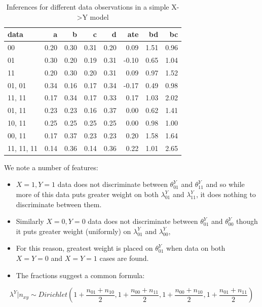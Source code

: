 \documentclass[
  12pt,
]{book}
\providecommand{\tightlist}{%
  \setlength{\itemsep}{0pt}\setlength{\parskip}{0pt}}
\begin{document}
\begin{table}

\caption{\label{tab:XYresultstable}Inferences for different data observations in a simple X->Y model}
\centering
\begin{tabular}[t]{l|r|r|r|r|r|r|r}
\hline
data & a & b & c & d & ate & bd & bc\\
\hline
00 & 0.20 & 0.30 & 0.31 & 0.20 & 0.09 & 1.51 & 0.96\\
\hline
01 & 0.30 & 0.20 & 0.19 & 0.31 & -0.10 & 0.65 & 1.04\\
\hline
11 & 0.20 & 0.30 & 0.20 & 0.31 & 0.09 & 0.97 & 1.52\\
\hline
01, 01 & 0.34 & 0.16 & 0.17 & 0.34 & -0.17 & 0.49 & 0.98\\
\hline
11, 11 & 0.17 & 0.34 & 0.17 & 0.33 & 0.17 & 1.03 & 2.02\\
\hline
01, 11 & 0.23 & 0.23 & 0.16 & 0.37 & 0.00 & 0.62 & 1.41\\
\hline
10, 11 & 0.25 & 0.25 & 0.25 & 0.25 & 0.00 & 0.98 & 1.00\\
\hline
00, 11 & 0.17 & 0.37 & 0.23 & 0.23 & 0.20 & 1.58 & 1.64\\
\hline
11, 11, 11 & 0.14 & 0.36 & 0.14 & 0.36 & 0.22 & 1.01 & 2.65\\
\hline
\end{tabular}
\end{table}

We note a number of features:

\begin{itemize}
\tightlist
\item
  \(X=1, Y=1\) data does not discriminate between \(\theta^Y_{01}\) and \(\theta^Y_{11}\) and so while more of this data puts greater weight on both \(\lambda^Y_{01}\) and \(\lambda^Y_{11}\), it does nothing to discriminate between them.
\item
  Similarly \(X=0, Y=0\) data does not discriminate between \(\theta^Y_{01}\) and \(\theta^Y_{00}\) though it puts greater weight (uniformly) on \(\lambda^Y_{01}\) and \(\lambda^Y_{00}\),
\item
  For this reason, greatest weight is placed on \(\theta^Y_{01}\) when data on both \(X=Y=0\) and \(X=Y=1\) cases are found.
\item
  The fractions suggest a common formula:
\end{itemize}

\[\lambda^Y|n_{xy} \sim Dirichlet\left(1+\frac{n_{01} + n_{10}}2, 1+\frac{n_{00} + n_{11}}2, 1+\frac{n_{00} + n_{10}}2, 1+\frac{n_{01} + n_{11}}2\right)\]
\end{document}

